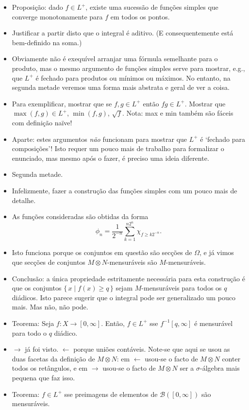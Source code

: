 \documentclass{article}
\begin{document}
\begin{itemize}
\item Proposição: dado $f \in L^+$, existe uma sucessão de funções simples que converge monotonamente para $f$ em todos os pontos.
\item Justificar a partir disto que o integral é aditivo. (E consequentemente está bem-definido na soma.)
\item Obviamente não é exequível arranjar uma fórmula semelhante para o produto, mas o mesmo argumento de funções simples serve para mostrar, e.g., que $L^+$ é fechado para produtos ou mínimos ou máximos. No entanto, na segunda metade veremos uma forma mais abstrata e geral de ver a coisa.
\item Para exemplificar, mostrar que se $f, g \in L^+$ então $fg \in L^+$. Mostrar que $\max(f,g) \in L^+$, $\min(f,g)$, $\sqrt f$. Nota: max e min também são fáceis com definição naïve!
\item Aparte: estes argumentos \emph{não} funcionam para mostrar que $L^+$ é `fechado para composições'! Isto requer um pouco mais de trabalho para formalizar o enunciado, mas mesmo após o fazer, é preciso uma ideia diferente.
\item Segunda metade.
\item Infelizmente, fazer a construção das funções simples com um pouco mais de detalhe.
\item As funções consideradas são obtidas da forma
\[\phi_n = \frac1{2^{-n}} \sum_{k=1}^{n 2^n} \chi_{f \geq k 2^{-n}}.\]
\item Isto funciona porque os conjuntos em questão são secções de $\Omega$, e já vimos que secções de conjuntos $M\otimes N$-mensuráveis são $M$-mensuráveis.
\item Conclusão: a única propriedade estritamente necessária para esta construção é que os conjuntos $\{\,x \mid f(x) \geq q\,\}$ sejam $M$-mensuráveis para todos os $q$ diádicos. Isto parece sugerir que o integral pode ser generalizado um pouco mais. Mas não, não pode.
\item Teorema: Seja $f : X \to [0,\infty]$. Então, $f \in L^+$ sse $f^{-1}[q,\infty]$ é mensurável para todo o $q$ diádico.
\item $\rightarrow$ já foi visto. $\leftarrow$ porque uniões contáveis. Note-se que aqui se usou as duas facetas da definição de $M \otimes N$: em $\leftarrow$ usou-se o facto de $M \otimes N$ conter todos os retângulos, e em $\rightarrow$ usou-se o facto de $M \otimes N$ ser a $\sigma$-álgebra mais pequena que faz isso.
\item Teorema: $f \in L^+$ sse preimagens de elementos de $\mathcal B([0,\infty])$ são mensuráveis.

\end{itemize}
\end{document}
